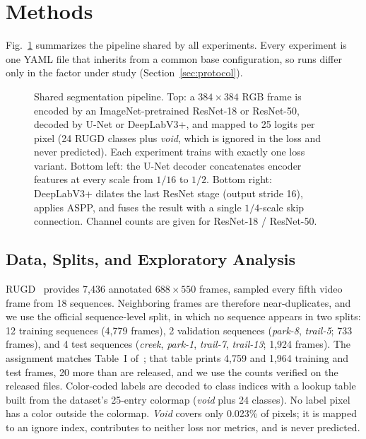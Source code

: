 \section{Methods}
\label{sec:methods}

Fig.~\ref{fig:arch} summarizes the pipeline shared by all experiments. Every
experiment is one YAML file that inherits from a common base configuration, so
runs differ only in the factor under study (Section~\ref{sec:protocol}).

\begin{figure}[t]
  \centering
  \resizebox{0.88\textwidth}{!}{}
  \caption{Shared segmentation pipeline. Top: a $384\times384$ RGB frame is
  encoded by an ImageNet-pretrained ResNet-18 or ResNet-50, decoded by U-Net
  or DeepLabV3+, and mapped to 25 logits per pixel (24 RUGD classes plus
  \emph{void}, which is ignored in the loss and never predicted). Each
  experiment trains with exactly one loss variant. Bottom left: the U-Net
  decoder concatenates encoder features at every scale from $1/16$ to $1/2$.
  Bottom right: DeepLabV3+ dilates the last ResNet stage (output stride 16),
  applies ASPP, and fuses the result with a single $1/4$-scale skip connection.
  Channel counts are given for ResNet-18 / ResNet-50.}
  \label{fig:arch}
\end{figure}

\subsection{Data, Splits, and Exploratory Analysis}
\label{sec:data}

RUGD~\cite{wigness2019rugd} provides 7,436 annotated $688\times550$ frames,
sampled every fifth video frame from 18 sequences. Neighboring frames are
therefore near-duplicates, and we use the official sequence-level split, in which
no sequence appears in two splits: 12 training sequences (4,779 frames), 2
validation sequences (\emph{park-8}, \emph{trail-5}; 733 frames), and 4 test
sequences (\emph{creek}, \emph{park-1}, \emph{trail-7}, \emph{trail-13}; 1,924
frames). The assignment matches Table~I of~\cite{wigness2019rugd}; that table
prints 4,759 and 1,964 training and test frames, 20 more than are released, and
we use the counts verified on the released files. Color-coded labels are decoded
to class indices with a lookup table built from the dataset's 25-entry colormap
(\emph{void} plus 24 classes). No label pixel has a color outside the colormap.
\emph{Void} covers only 0.023\% of pixels; it is mapped to an ignore index,
contributes to neither loss nor metrics, and is never predicted.


